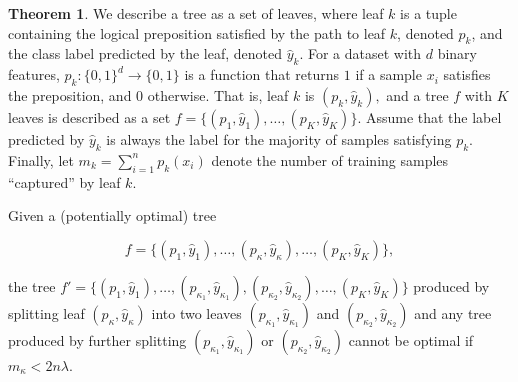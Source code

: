 \documentclass{article}
\theoremstyle{definition}
\newtheorem{theorem}{Theorem}[section]
\begin{document}
  \begin{theorem}
  We describe a tree as a set of leaves, where leaf $k$ is a tuple containing the logical preposition satisfied by the path to leaf $k$, denoted $p_k $, and the class label predicted by the leaf, denoted $\hat{y}_k$. For a dataset with $d$ binary features, $p_k: \{0, 1\}^d \to \{0, 1\}$ is a function that returns $1$ if a sample $x_i$ satisfies the preposition, and $0$ otherwise. That is, leaf $k$ is $(p_k, \hat{y}_k),$ and a tree $f$ with $K$ leaves is described as a set $f = \{(p_1, \hat{y}_1), \hdots, (p_K, \hat{y}_K)\}$. Assume that the label predicted by $\hat{y}_k$ is always the label for the majority of samples satisfying $p_k$. Finally, let $m_k = \sum_{i=1}^n p_k(x_i)$ denote the number of training samples ``captured'' by leaf $k$.

  Given a (potentially optimal) tree 

    \[f = \{(p_1, \hat{y}_1), \hdots, (p_{\kappa}, \hat{y}_{\kappa}), \hdots, (p_K, \hat{y}_K)\}, \]

  the tree $f' = \{(p_1, \hat{y}_1), \hdots, (p_{\kappa_1}, \hat{y}_{\kappa_1}), (p_{\kappa_2}, \hat{y}_{\kappa_2}), \hdots, (p_K, \hat{y}_K)\}$ produced by splitting leaf $(p_{\kappa}, \hat{y}_{\kappa})$ into two leaves $(p_{\kappa_1}, \hat{y}_{\kappa_1})$ and $(p_{\kappa_2}, \hat{y}_{\kappa_2})$ and any tree produced by further splitting $(p_{\kappa_1}, \hat{y}_{\kappa_1})$ or $(p_{\kappa_2}, \hat{y}_{\kappa_2})$ cannot  be optimal if $m_{\kappa} < 2n\lambda$.
  \end{theorem}
\end{document}
